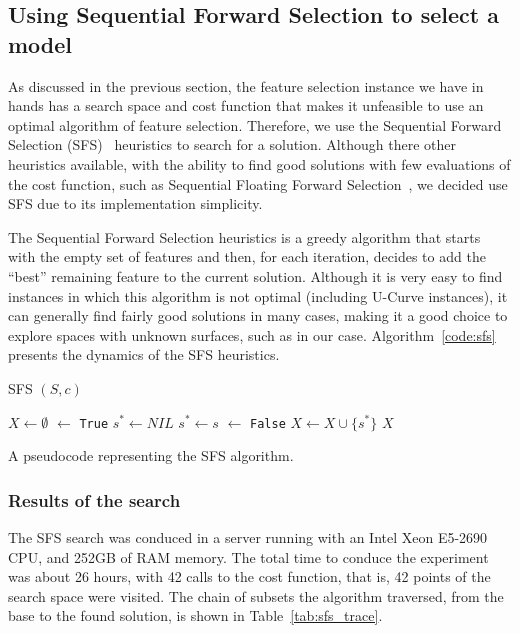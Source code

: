 \subsection{Using Sequential Forward Selection to select a model}
As discussed in the previous section, the feature selection instance we
have in hands has a search space and cost function that makes it
unfeasible to use an optimal algorithm of feature selection. Therefore,
we use the Sequential Forward Selection (SFS)~\cite{Whitney1971} 
heuristics to search for a solution. Although there other heuristics
available, with the ability to find good solutions with few evaluations
of the cost function, such as Sequential Floating Forward
Selection~\cite{Ververidis2008}, we decided use SFS due to its
implementation simplicity.

The Sequential Forward Selection heuristics is a greedy algorithm that
starts with the empty set of features and then, for each iteration,
decides to add the ``best'' remaining feature to the current solution.
Although it is very easy to find instances in which this algorithm is
not optimal (including U-Curve instances), it can generally find fairly
good solutions in many cases, making it a good choice to explore spaces
with unknown surfaces, such as in our case. Algorithm~\ref{code:sfs}
presents the dynamics of the SFS heuristics.

\begin{algorithm}[H]
\textsc{SFS} $(S, c)$
\begin{algorithmic}[1]
    \State $X \gets \emptyset$
     $\gets$ {\tt True}
        \State $s^* \gets NIL$
                \State $s^* \gets s$
            \EndIf
        \EndFor
             $\gets$ {\tt False}
        \EndIf
    \State $X \gets X \cup \{s^*\}$
    \EndWhile
    \Return $X$
\end{algorithmic}
\caption{A pseudocode representing the SFS algorithm.}
\label{code:sfs}
\end{algorithm}


\subsubsection{Results of the search}
The SFS search was conduced in a server running with an Intel 
Xeon E5-2690 CPU, and 252GB of RAM memory. The total time to conduce the
experiment was about 26 hours, with 42 calls to the cost function, that
is, 42 points of the search space were visited. The chain of subsets the
algorithm traversed, from the base to the found solution, is shown in 
Table~\ref{tab:sfs_trace}.

